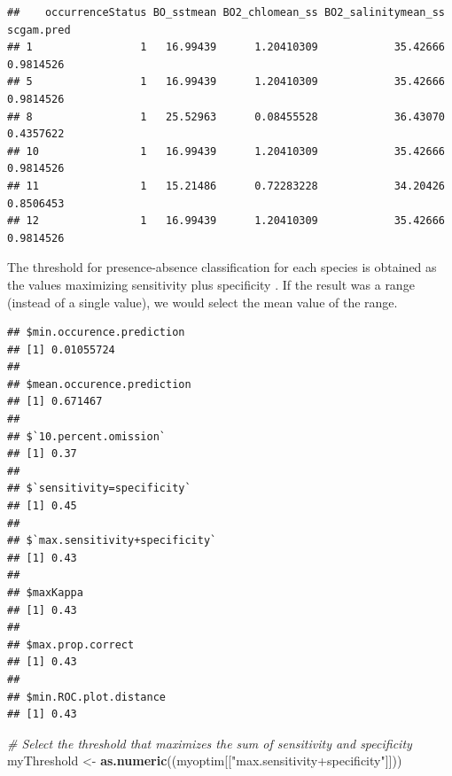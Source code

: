 \documentclass[
]{book}
\newenvironment{Shaded}{\begin{snugshade}}{\end{snugshade}}
\newcommand{\CommentTok}[1]{\textcolor[rgb]{0.56,0.35,0.01}{\textit{#1}}}
\newcommand{\FunctionTok}[1]{\textcolor[rgb]{0.13,0.29,0.53}{\textbf{#1}}}
\newcommand{\NormalTok}[1]{#1}
\newcommand{\OtherTok}[1]{\textcolor[rgb]{0.56,0.35,0.01}{#1}}
\newcommand{\SpecialCharTok}[1]{\textcolor[rgb]{0.81,0.36,0.00}{\textbf{#1}}}
\newcommand{\StringTok}[1]{\textcolor[rgb]{0.31,0.60,0.02}{#1}}
\begin{document}
\begin{verbatim}
##    occurrenceStatus BO_sstmean BO2_chlomean_ss BO2_salinitymean_ss scgam.pred
## 1                 1   16.99439      1.20410309            35.42666  0.9814526
## 5                 1   16.99439      1.20410309            35.42666  0.9814526
## 8                 1   25.52963      0.08455528            36.43070  0.4357622
## 10                1   16.99439      1.20410309            35.42666  0.9814526
## 11                1   15.21486      0.72283228            34.20426  0.8506453
## 12                1   16.99439      1.20410309            35.42666  0.9814526
\end{verbatim}

The threshold for presence-absence classification for each species is obtained as the values maximizing sensitivity plus specificity \citep{jimenez_etal_2007}. If the result was a range (instead of a single value), we would select the mean value of the range.

\begin{Shaded}
\end{Shaded}

\begin{verbatim}
## $min.occurence.prediction
## [1] 0.01055724
## 
## $mean.occurence.prediction
## [1] 0.671467
## 
## $`10.percent.omission`
## [1] 0.37
## 
## $`sensitivity=specificity`
## [1] 0.45
## 
## $`max.sensitivity+specificity`
## [1] 0.43
## 
## $maxKappa
## [1] 0.43
## 
## $max.prop.correct
## [1] 0.43
## 
## $min.ROC.plot.distance
## [1] 0.43
\end{verbatim}

\begin{Shaded}
\begin{Highlighting}[]
\CommentTok{\# Select the threshold that maximizes the sum of sensitivity and specificity }
\NormalTok{myThreshold }\OtherTok{\textless{}{-}} \FunctionTok{as.numeric}\NormalTok{((myoptim[[}\StringTok{"max.sensitivity+specificity"}\NormalTok{]]))}
\end{Highlighting}
\end{Shaded}
\end{document}
